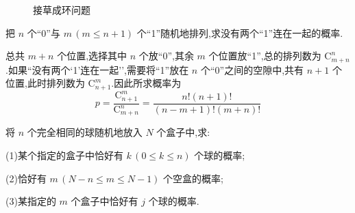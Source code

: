 \begin{solution}
\begin{figure}[H]

        \caption{接草成环问题}
        \label{fig:例题-接草成环问题}
    \end{figure}
\end{solution}

\question\label{n个0与m个1} 把 $n$ 个``0''与 $m \, (m \leqslant n+1)$ 个``1''随机地排列,求没有两个``1''连在一起的概率.

\begin{solution}
    总共 $m+n$ 个位置,选择其中 $n$ 个放``0'',其余 $m$ 个位置放``1'',总的排列数为 $\mathrm{C}_{m+n}^n$.如果``没有两个`1'连在一起'',需要将``1''放在 $n$ 个``0''之间的空隙中,共有 $n+1$ 个位置,此时排列数为 $\mathrm{C}_{n+1}^m$.因此所求概率为
    $$
    p = \dfrac{\mathrm{C}_{n+1}^m}{\mathrm{C}_{m+n}^n} = \dfrac{n! (n+1)!}{(n-m+1)! (m+n)!}
    $$
\end{solution}

\question[插板法] 将 $n$ 个完全相同的球随机地放入 $N$ 个盒子中,求:

(1)某个指定的盒子中恰好有 $k \, (0 \leqslant k \leqslant n)$ 个球的概率;

(2)恰好有 $m \, (N-n \leqslant m \leqslant N-1)$ 个空盒的概率;

(3)某指定的 $m$ 个盒子中恰好有 $j$ 个球的概率.

